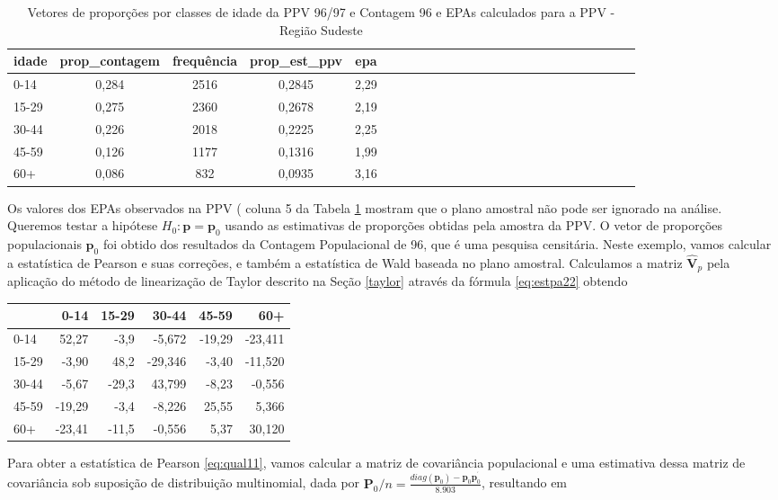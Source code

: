 \documentclass[]{book}
\theoremstyle{definition}
\theoremstyle{definition}
\theoremstyle{definition}
\theoremstyle{remark}
\begin{document}
\begin{table}

\caption{\label{tab:ppcount}Vetores de proporções por classes de idade da PPV 96/97 e Contagem
 96 e EPAs calculados para a PPV - Região Sudeste}
\centering
\begin{tabular}[t]{lcccclcccclcccclcccclcccc}
\toprule
idade & prop\_contagem & frequência & prop\_est\_ppv & epa\\
\midrule
0-14 & 0,284 & 2516 & 0,2845 & 2,29\\
15-29 & 0,275 & 2360 & 0,2678 & 2,19\\
30-44 & 0,226 & 2018 & 0,2225 & 2,25\\
45-59 & 0,126 & 1177 & 0,1316 & 1,99\\
60+ & 0,086 & 832 & 0,0935 & 3,16\\
\bottomrule
\end{tabular}
\end{table}

Os valores dos EPAs observados na PPV ( coluna 5 da Tabela
\ref{tab:ppcount} mostram que o plano amostral não pode ser ignorado na
análise. Queremos testar a hipótese \(H_{0}:\mathbf{p=p}_{0}\) usando as
estimativas de proporções obtidas pela amostra da PPV. O vetor de
proporções populacionais \(\mathbf{p}_{0}\) foi obtido dos resultados da
Contagem Populacional de 96, que é uma pesquisa censitária. Neste
exemplo, vamos calcular a estatística de Pearson e suas correções, e
também a estatística de Wald baseada no plano amostral. Calculamos a
matriz \(\widehat{\mathbf{V}}_{p}\) pela aplicação do método de
linearização de Taylor descrito na Seção \ref{taylor} através da fórmula
\eqref{eq:estpa22} obtendo

\begin{tabular}{l|r|r|r|r|r}
\hline
  & 0-14 & 15-29 & 30-44 & 45-59 & 60+\\
\hline
0-14 & 52,27 & -3,9 & -5,672 & -19,29 & -23,411\\
\hline
15-29 & -3,90 & 48,2 & -29,346 & -3,40 & -11,520\\
\hline
30-44 & -5,67 & -29,3 & 43,799 & -8,23 & -0,556\\
\hline
45-59 & -19,29 & -3,4 & -8,226 & 25,55 & 5,366\\
\hline
60+ & -23,41 & -11,5 & -0,556 & 5,37 & 30,120\\
\hline
\end{tabular}

Para obter a estatística de Pearson \eqref{eq:qual11}, vamos calcular a
matriz de covariância populacional e uma estimativa dessa matriz de
covariância sob suposição de distribuição multinomial, dada por
\(\mathbf{P}_{0}/n=\frac{diag\left( \mathbf{p}_{0}\right) -\mathbf{p}_{0}\mathbf{p}_{0}^{^{\prime }}}{8.903}\),
resultando em
\end{document}
